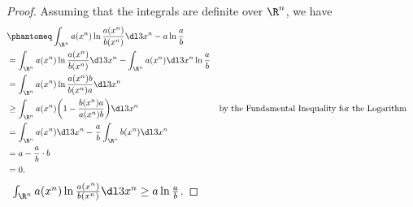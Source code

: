 \documentclass[
  coursecode={MTHE 474},
  assignmentname={Homework \homeworknumber},
  studentnumber=20053722,
  name={Bryan Hoang},
  draft,
]{
  ltxanswer%
}
\begin{document}
  \begin{questions}
    \setcounter{question}{\questionnumber}
    \addtocounter{question}{-1}
    \question[15]\
    \begin{parts}
      \part{}
      \begin{solution}
        \begin{proof}
          Assuming that the integrals are definite over \(\R^{n}\), we have
          \begin{align*}
             &\phantomeq \int_{\R^{n}} a(x^{n}) \ln \frac{a(x^{n})}{b(x^{n})} \dl3x^{n} - a \ln \frac{a}{b}                                                                                 \\
             &= \int_{\R^{n}} a(x^{n}) \ln \frac{a(x^{n})}{b(x^{n})} \dl3x^{n} - \int_{\R^{n}} a(x^{n}) \dl3x^{n} \ln \frac{a}{b}                                                           \\
             &= \int_{\R^{n}} a(x^{n}) \ln \frac{a(x^{n})b}{b(x^{n})a} \dl3x^{n}                                                                                                            \\
             &\ge \int_{\R^{n}} a(x^{n})\biggl(1 - \frac{b(x^{n})a}{a(x^{n})b}\biggr) \dl3x^{n}                                   & &\text{by the Fundamental Inequality for the Logarithm} \\
             &= \int_{\R^{n}} a(x^{n}) \dl3x^{n} - \frac{a}{b} \int_{\R^{n}} b(x^{n}) \dl3x^{n}                                                                                             \\
             &= a - \frac{a}{b} \cdot b                                                                                                                                                     \\
             &= 0.
          \end{align*}
          \therefore\ \(\int_{\R^{n}} a(x^{n}) \ln \frac{a(x^{n})}{b(x^{n})} \dl3x^{n} \ge a \ln \frac{a}{b}\).
        \end{proof}
      \end{solution}


\end{parts}
\end{questions}
\end{document}
